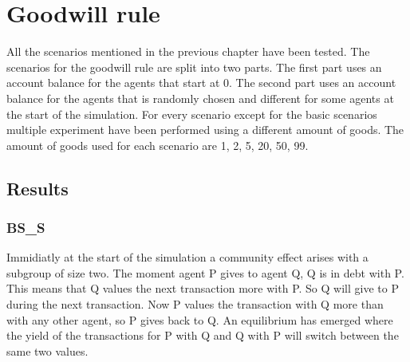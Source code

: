 \documentclass[twoside,openright]{uva-bachelor-thesis}
\begin{document}
\section{Goodwill rule}
All the scenarios mentioned in the previous chapter have been tested. The scenarios for the goodwill rule are split into two parts. The first part uses an account balance for the agents that start at 0. The second part uses an account balance for the agents that is randomly chosen and different for some agents at the start of the simulation. For every scenario except for the basic scenarios multiple experiment have been performed using a different amount of goods. The amount of goods used for each scenario are 1, 2, 5, 20, 50, 99.
\subsection{Results}

\subsubsection{BS\_S}
Immidiatly at the start of the simulation a community effect arises with a subgroup of size two. The moment agent P gives to agent Q, Q is in debt with P. This means that Q values the next transaction more with P. So Q will give to P during the next transaction. Now P values the transaction with Q more than with any other agent, so P gives back to Q. An equilibrium has emerged where the yield of the transactions for P with Q and Q with P will switch between the same two values. 
\end{document}
